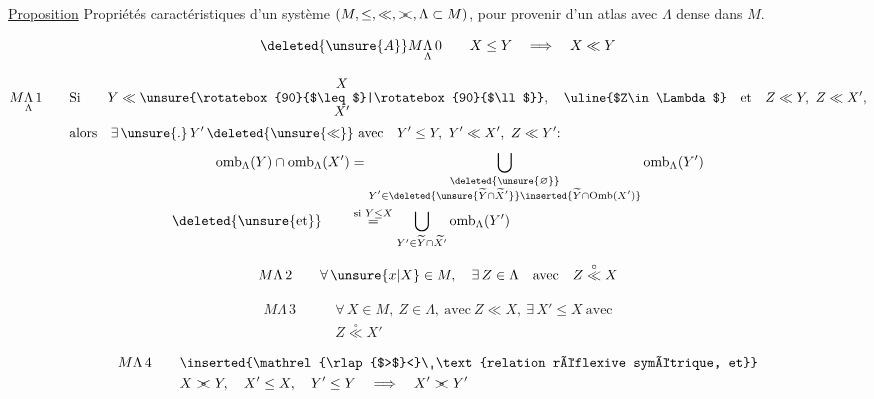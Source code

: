 \uline{Proposition} Propriétés caractéristiques d'un système $(M,\leq,\ll,\mathrel{\rlap{$>$}<},\Lambda\subset M)$, pour provenir d'un atlas avec $\Lambda$ dense dans $M$.

\[
\deleted{\unsure{A}}M\underset{\Lambda}{\Lambda}\,0\qquad X\leq Y\quad\Longrightarrow\quad X\ll Y
\]

\[
\begin{aligned}
M\underset{\Lambda}{\Lambda}\,1\qquad&\text{Si}\qquad Y\ll \begin{matrix}X\\[-.4ex]\unsure{\rotatebox{90}{$\leq$}|\rotatebox{90}{$\ll$}}\\[-.4ex]X'\end{matrix},\quad \text{\uline{$Z\in\Lambda$}}\quad\text{et}\quad Z\ll Y,\ Z\ll X',\\
&\text{alors}\quad \exists\,\unsure{\mathord{.}}\,Y'\,\deleted{\unsure{\ll}}\ \text{avec}\quad Y'\leq Y,\ Y'\ll X',\ Z\ll Y'\mathpunct{:}
\end{aligned}
\]
\[
\begin{aligned}
\mathrm{omb}_{\Lambda}(Y)\cap \mathrm{omb}_{\Lambda}(X')&=\bigcup_{\substack{\deleted{\unsure{\varnothing}}\\Y'\in\deleted{\unsure{\widetilde Y\cap\widetilde X'}}\inserted{\widetilde Y\cap\mathrm{Omb}(X')}}}\mathrm{omb}_{\Lambda}(Y')\\
\deleted{\unsure{\text{et}}}\qquad&\overset{\text{si }Y\leq X}{=}\bigcup_{Y'\in\widetilde Y\cap\widetilde{X'}}\mathrm{omb}_{\Lambda}(Y')
\end{aligned}
\]

\[
M\Lambda\,2\qquad \forall\,\unsure{x|X}\in M,\quad\exists\,Z\in\Lambda\quad\text{avec}\quad Z\overset{\circ}{\ll} X
\]

\[
\begin{aligned}
M\Lambda\,3\qquad&\forall\,X\in M,\ Z\in\Lambda,\ \text{avec}\ Z\ll X,\ \exists\,X'\leq X\ \text{avec}\\
&Z\overset{\circ}{\ll} X'
\end{aligned}
\]

\[
\begin{aligned}
M\Lambda\,4\qquad &\inserted{\mathrel{\rlap{$>$}<}\ \text{relation réflexive symétrique, et}}\\
&X\mathrel{\rlap{$>$}<} Y,\quad X'\leq X,\quad Y'\leq Y\quad\Longrightarrow\quad X'\mathrel{\rlap{$>$}<} Y'
\end{aligned}
\]


